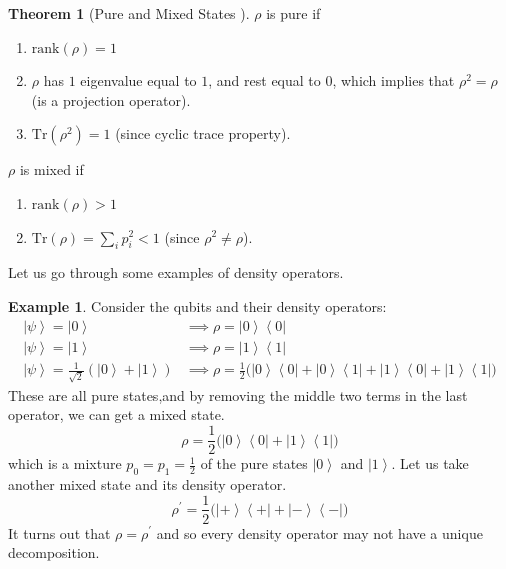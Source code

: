 \documentclass{article}
\newcommand{\ket}[1]{\ensuremath{\left|#1\right\rangle}}
\newcommand{\bra}[1]{\ensuremath{\left\langle#1\right|}}
\theoremstyle{definition}
\newtheorem{theorem}{Theorem}[section]
\newtheorem{example}{Example}[section]
\begin{document}
  \begin{theorem}[Pure and Mixed States ]
    $\rho$ is pure if 
    \begin{enumerate} 
      \item $\mathrm{rank}(\rho) = 1$ 
      \item $\rho$ has $1$ eigenvalue equal to $1$, and rest equal to $0$, which implies that $\rho^2 = \rho$ (is a projection operator).
      \item $\mathrm{Tr}(\rho^2) = 1$ (since cyclic trace property). 
    \end{enumerate}

    $\rho$ is mixed if 
    \begin{enumerate} 
      \item $\mathrm{rank}(\rho) > 1$
      \item $\mathrm{Tr}(\rho) = \sum_i p_i^2 < 1$ (since $\rho^2 \neq \rho$).
    \end{enumerate}
  \end{theorem}
  
  Let us go through some examples of density operators. 

  \begin{example} 
    Consider the qubits and their density operators: 
    \begin{align} 
      \ket{\psi} = \ket{0} & \implies \rho = \ket{0} \bra{0} \\
      \ket{\psi} = \ket{1} & \implies \rho = \ket{1} \bra{1} \\
      \ket{\psi} = \frac{1}{\sqrt{2}} ( \ket{0} + \ket{1}) & \implies \rho = \frac{1}{2} \big( \ket{0} \bra{0} + \ket{0} \bra{1} + \ket{1} \bra{0} + \ket{1} \bra{1} \big) 
    \end{align}
    These are all pure states,and by removing the middle two terms in the last operator, we can get a mixed state. 
    \begin{equation} 
      \rho = \frac{1}{2} \big( \ket{0} \bra{0} + \ket{1} \bra{1} \big) 
    \end{equation}
    which is a mixture $p_0 = p_1 = \frac{1}{2}$ of the pure states $\ket{0}$ and $\ket{1}$. Let us take another mixed state and its density operator. 
    \begin{equation} 
      \rho^\prime = \frac{1}{2} \big( \ket{+} \bra{+} + \ket{-} \bra{-} \big)
    \end{equation}
    It turns out that $\rho = \rho^\prime$ and so every density operator may not have a unique decomposition. 
  \end{example}
\end{document}
